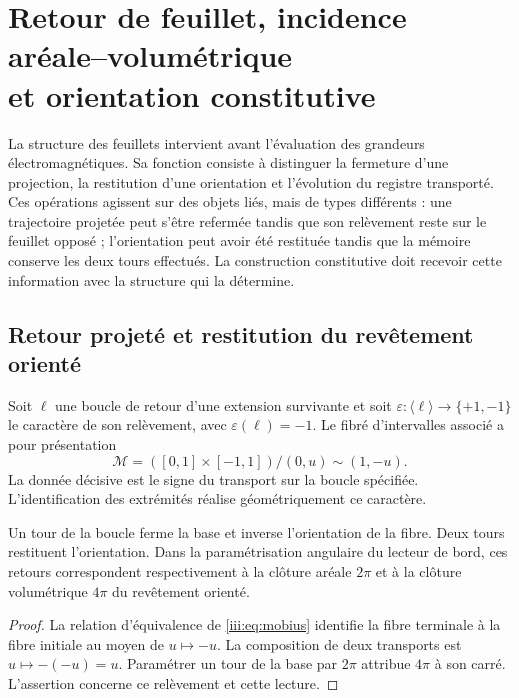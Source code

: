 \section[Retour de feuillet, incidence aréale--volumétrique et orientation constitutive]{Retour de feuillet, incidence aréale--volumétrique\\et orientation constitutive}
\label{iii:sec:hojas}
\label{nuclear:constitutiva-antecedente}

La structure des feuillets intervient avant l’évaluation des grandeurs
électromagnétiques. Sa fonction consiste à distinguer la fermeture d’une projection,
la restitution d’une orientation et l’évolution du registre transporté.
Ces opérations agissent sur des objets liés, mais de types différents : une
trajectoire projetée peut s’être refermée tandis que son relèvement reste
sur le feuillet opposé ; l’orientation peut avoir été restituée tandis que la mémoire
conserve les deux tours effectués. La construction constitutive doit recevoir
cette information avec la structure qui la détermine.

\subsection{Retour projeté et restitution du revêtement orienté}

Soit $\ell$ une boucle de retour d’une extension survivante et soit
$\varepsilon:\langle\ell\rangle\to\{+1,-1\}$ le caractère de son
relèvement, avec $\varepsilon(\ell)=-1$. Le fibré d’intervalles associé
a pour présentation
\begin{equation}
 \mathcal M=([0,1]\times[-1,1])/{(0,u)\sim(1,-u)}.
 \label{iii:eq:mobius}
\end{equation}
La donnée décisive est le signe du transport sur la boucle spécifiée.
L’identification des extrémités réalise géométriquement ce caractère.

\begin{proposition}
Un tour de la boucle ferme la base et inverse l’orientation de la fibre. Deux
tours restituent l’orientation. Dans la paramétrisation angulaire du lecteur de
bord, ces retours correspondent respectivement à la clôture aréale $2\pi$ et
à la clôture volumétrique $4\pi$ du revêtement orienté.
\end{proposition}
\begin{proof}
La relation d’équivalence de \eqref{iii:eq:mobius} identifie la fibre terminale
à la fibre initiale au moyen de $u\mapsto-u$. La composition de deux transports est
$u\mapsto-(-u)=u$. Paramétrer un tour de la base par $2\pi$ attribue $4\pi$
à son carré. L’assertion concerne ce relèvement et cette lecture.
\end{proof}

